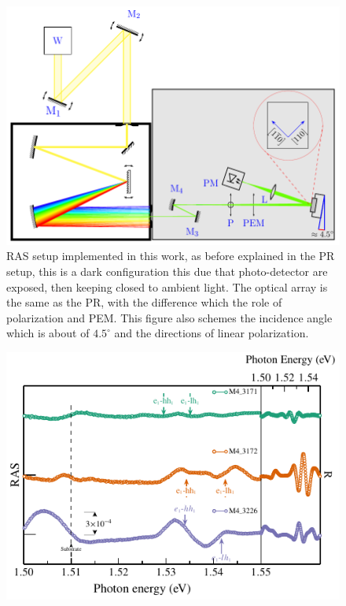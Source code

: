 \begin{figure}[H]
	\centering
	\includegraphics[width=\textwidth]{../figures/chapter-3/ras-setup/build/ras-setup-2.pdf}
	\caption[RAS Scheme]{RAS setup implemented in this work, as  before explained in the PR  setup, this is a  dark configuration this due that photo-detector are exposed, then keeping closed to ambient light. The optical array is the same as the PR, with the difference which the role of polarization and PEM. This figure also schemes the  incidence angle which is about of $4.5^{\circ}$ and the directions of linear polarization.  }
	\label{fig:chapter-3-ras-setup}
\end{figure}



\begin{figure}[H]
	\centering
	\includegraphics[width=\textwidth]{../figures/chapter-3/ras-plots/out/ras-set-1.pdf}
	\caption{ }
	\label{fig:chapter-3-subsec-ras-plots-set-1}
\end{figure}


